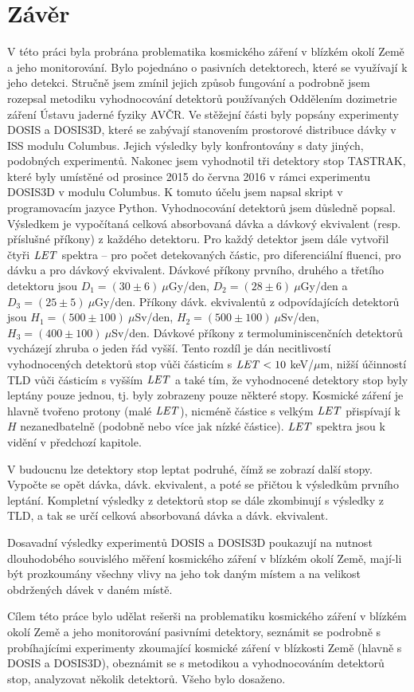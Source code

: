 \chapter*{Závěr}
V této práci byla probrána problematika kosmického záření v blízkém okolí Země a jeho monitorování. Bylo pojednáno o pasivních detektorech, které se využívají k jeho detekci. Stručně jsem zmínil jejich způsob fungování a podrobně jsem rozepsal metodiku vyhodnocování detektorů používaných Oddělením dozimetrie záření Ústavu jaderné fyziky AVČR. Ve stěžejní části byly popsány experimenty DOSIS a DOSIS3D, které se zabývají stanovením prostorové distribuce dávky v ISS modulu Columbus. Jejich výsledky byly konfrontovány s daty jiných, podobných experimentů. Nakonec jsem vyhodnotil tři detektory stop TASTRAK, které byly umístěné od prosince 2015 do června 2016 v rámci experimentu DOSIS3D v modulu Columbus. K tomuto účelu jsem napsal skript v programovacím jazyce Python.
Vyhodnocování detektorů jsem důsledně popsal. Výsledkem je vypočítaná celková absorbovaná dávka a dávkový ekvivalent (resp. příslušné příkony) z každého detektoru. Pro každý detektor
jsem dále vytvořil čtyři $\mathit{LET}$ spektra -- pro počet detekovaných částic, pro diferenciální fluenci, pro dávku a pro dávkový ekvivalent. Dávkové příkony prvního, druhého a třetího detektoru jsou $D_1=(30\pm6)\ \mu$Gy/den, $D_2=(28\pm6)\ \mu$Gy/den a $D_3=(25\pm5)\ \mu$Gy/den. Příkony dávk. ekvivalentů z odpovídajících detektorů jsou $H_1=(500\pm100)\ \mu$Sv/den, $H_2=(500\pm100)\ \mu$Sv/den, $H_3=(400\pm100)\ \mu$Sv/den. Dávkové příkony z termoluminiscenčních detektorů vycházejí zhruba o jeden řád vyšší. Tento rozdíl je dán necitlivostí vyhodnocených detektorů stop vůči částicím s $\mathit{LET}<10$ keV/$\mu$m, nižší účinností TLD vůči částicím s vyšším $\mathit{LET}$ a také tím, že vyhodnocené detektory stop byly leptány pouze jednou, tj. byly zobrazeny pouze některé stopy. Kosmické záření je
hlavně tvořeno protony (malé $\mathit{LET}$), nicméně částice s velkým $\mathit{LET}$ přispívají k $H$ nezanedbatelně (podobně nebo více jak nízké částice). $\mathit{LET}$ spektra jsou k vidění v předchozí kapitole.

V budoucnu lze detektory stop leptat podruhé, čímž se zobrazí další stopy. Vypočte se opět dávka, dávk. ekvivalent, a poté se přičtou k výsledkům prvního leptání. Kompletní výsledky z detektorů stop se dále zkombinují s výsledky z TLD, a tak se určí celková absorbovaná dávka a dávk. ekvivalent. 

Dosavadní výsledky experimentů DOSIS a DOSIS3D poukazují na nutnost dlouhodobého souvislého měření kosmického záření v blízkém okolí Země, mají-li být prozkoumány všechny vlivy na jeho tok daným místem a na velikost obdržených dávek v daném místě.

Cílem této práce bylo udělat rešerši na problematiku kosmického záření v blízkém okolí Země a jeho monitorování pasivními detektory, seznámit se podrobně s probíhajícími experimenty zkoumající kosmické záření v blízkosti Země (hlavně s DOSIS a DOSIS3D), obeznámit se s metodikou a vyhodnocováním detektorů stop, analyzovat několik detektorů. Všeho bylo dosaženo. 
